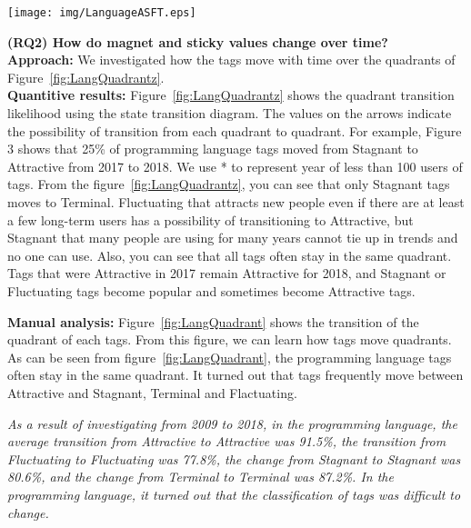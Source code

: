 \documentclass[conference]{IEEEtran}
\begin{document}
\begin{figure*}[t]
 \centering
 \texttt{[image: img/LanguageASFT.eps]}  
 \caption{Quadrant Transition of Programing Language 2009 - 2018} 
 \label{fig:LangQuadrant} 
\end{figure*}


\textbf{(RQ2) How do magnet and sticky values change over time?} \\
\smallskip\smallskip
\textbf{Approach:}
We investigated how the tags move with time over the quadrants of Figure~\ref{fig:LangQuadrantz}. \\
\textbf{Quantitive results:}
Figure~\ref{fig:LangQuadrantz} shows the quadrant transition likelihood using the state transition diagram. The values ​​on the arrows indicate the possibility of transition from each quadrant to quadrant. For example, Figure 3 shows that 25\% of programming language tags moved from Stagnant to Attractive from 2017 to 2018. We use * to represent year of less than 100 users of tags.
From the figure~\ref{fig:LangQuadrantz}, you can see that only Stagnant tags moves to Terminal. Fluctuating that attracts new people even if there are at least a few long-term users has a possibility of transitioning to Attractive, but Stagnant that many people are using for many years cannot tie up in trends and no one can use. Also, you can see that all tags often stay in the same quadrant. Tags that were Attractive in 2017 remain Attractive for 2018, and Stagnant or Fluctuating tags become popular and sometimes become Attractive tags.
\smallskip\smallskip

\textbf{Manual analysis:}
Figure~\ref{fig:LangQuadrant} shows the transition of the quadrant of each tags. From this figure, we can learn how tags move quadrants.
As can be seen from figure~\ref{fig:LangQuadrant}, the programming language tags often stay in the same quadrant. It turned out that tags frequently move between Attractive and Stagnant, Terminal and Flactuating.
\smallskip\smallskip

\begin{oframed}
\emph{As a result of investigating from 2009 to 2018, in the programming language, the average transition from Attractive to Attractive was 91.5\%, the transition from Fluctuating to Fluctuating was 77.8\%, the change from Stagnant to Stagnant was 80.6\%, and the change from Terminal to Terminal was 87.2\%.  In the programming language, it turned out that the classification of tags was difficult to change.}
\end{oframed}
\end{document}
